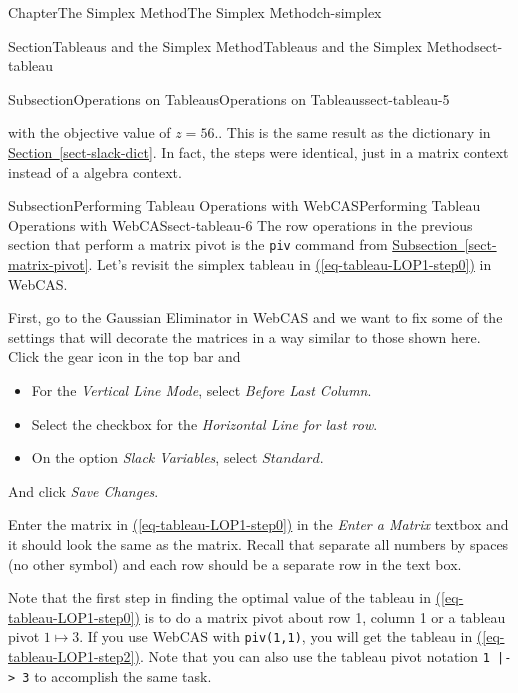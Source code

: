 \documentclass[oneside,10pt,]{book}
\newcommand{\xreffont}{\relax}
\newcommand{\mono}[1]{\texttt{#1}}
\numberwithin{equation}{section}
\begin{document}
\begin{chapterptx}{Chapter}{The Simplex Method}{}{The Simplex Method}{}{}{ch-simplex}
\begin{sectionptx}{Section}{Tableaus and the Simplex Method}{}{Tableaus and the Simplex Method}{}{}{sect-tableau}
\begin{subsectionptx}{Subsection}{Operations on Tableaus}{}{Operations on Tableaus}{}{}{sect-tableau-5}
\begin{equation*}
\end{equation*}
%
\par
with the objective value of \(z=56.\). This is the same result as the dictionary in \hyperref[sect-slack-dict]{Section~{\xreffont\ref{sect-slack-dict}}}. In fact, the steps were identical, just in a matrix context instead of a algebra context.%
\end{subsectionptx}
%
%
\typeout{************************************************}
\typeout{************************************************}
%
\begin{subsectionptx}{Subsection}{Performing Tableau Operations with WebCAS}{}{Performing Tableau Operations with WebCAS}{}{}{sect-tableau-6}
The row operations in the previous section that perform a matrix pivot is the \mono{piv} command from \hyperref[sect-matrix-pivot]{Subsection~{\xreffont\ref{sect-matrix-pivot}}}. Let's revisit the simplex tableau in \hyperref[eq-tableau-LOP1-step0]{({\xreffont\ref{eq-tableau-LOP1-step0}})} in WebCAS.%
\par
First, go to the Gaussian Eliminator in WebCAS and we want to fix some of the settings that will decorate the matrices in a way similar to those shown here. Click the gear icon in the top bar and%
\par
%
\begin{itemize}[label=\textbullet]
\item{}For the \emph{Vertical Line Mode}, select \emph{Before Last Column}.%
\item{}Select the checkbox for the \emph{Horizontal Line for last row}.%
\item{}On the option \emph{Slack Variables}, select \(Standard\).%
\end{itemize}
%
\par
And click \emph{Save Changes}.%
\par
Enter the matrix in \hyperref[eq-tableau-LOP1-step0]{({\xreffont\ref{eq-tableau-LOP1-step0}})} in the \emph{Enter a Matrix} textbox and it should look the same as the matrix. Recall that separate all numbers by spaces (no other symbol) and each row should be a separate row in the text box.%
\par
Note that the first step in finding the optimal value of the tableau in \hyperref[eq-tableau-LOP1-step0]{({\xreffont\ref{eq-tableau-LOP1-step0}})} is to do a matrix pivot about row 1, column 1 or a tableau pivot \(1 \mapsto 3\). If you use WebCAS with \mono{piv(1,1)}, you will get the tableau in \hyperref[eq-tableau-LOP1-step2]{({\xreffont\ref{eq-tableau-LOP1-step2}})}. Note that you can also use the tableau pivot notation \mono{1 |-> 3} to accomplish the same task.%

\end{subsectionptx}
\end{sectionptx}
\end{chapterptx}
\end{document}

